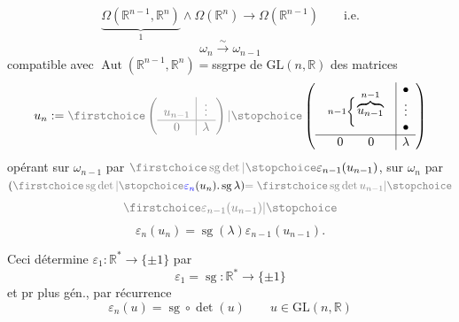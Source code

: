 \[
\underbrace{\Omega(\mathbb{R}^{n-1},\mathbb{R}^n)}_{1}\wedge\Omega(\mathbb{R}^n)\longrightarrow\Omega(\mathbb{R}^{n-1})\qquad\text{i.e.}
\]
\[
\omega_n\xrightarrow{\sim}\omega_{n-1}
\]
compatible avec $\operatorname{Aut}(\mathbb{R}^{n-1},\mathbb{R}^n)={}$ssgrpe de $\mathrm{GL}(n,\mathbb{R})$ des matrices
\[
u_n:=\deleted{\unsure{\left(\begin{array}{c|c}u_{n-1}&\vdots\\\hline0&\lambda\end{array}\right)}}
\left(\begin{array}{c|c}
\begin{array}{c@{}c}\scriptstyle n-1\left\{\vphantom{\begin{matrix}a\\b\end{matrix}}\right.&\overbrace{u_{n-1}}^{n-1}\end{array}&\begin{matrix}\bullet\\\vdots\\\bullet\end{matrix}\\\hline
0\qquad0&\lambda
\end{array}\right)
\]
opérant sur $\omega_{n-1}$ par $\deleted{\unsure{\operatorname{sg}\det}}\varepsilon_{n-1}(u_{n-1})$, sur $\omega_n$ par $(\deleted{\unsure{\operatorname{sg}\det}}\inserted{\varepsilon_n}(u_n).\operatorname{sg}\lambda)\deleted{=\unsure{\operatorname{sg}\det u_{n-1}}}$
\[
\deleted{\unsure{\varepsilon_{n-1}(u_{n-1})}}
\]
\[
\boxed{\varepsilon_n(u_n)=\operatorname{sg}(\lambda)\varepsilon_{n-1}(u_{n-1})}.
\]


Ceci détermine $\varepsilon_1:\mathbb{R}^*\longrightarrow\{\pm1\}$ par
\[
\varepsilon_1=\operatorname{sg}:\mathbb{R}^*\longrightarrow\{\pm1\}
\]
et pr  plus gén., par récurrence
\[
\varepsilon_n(u)=\operatorname{sg}\circ\det(u)\qquad u\in\mathrm{GL}(n,\mathbb{R})
\]

